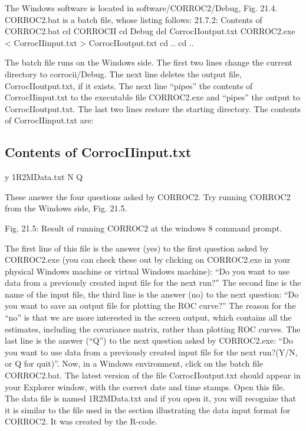 \documentclass[
]{book}
\begin{document}
The Windows software is located in software/CORROC2/Debug, Fig. 21.4. CORROC2.bat is a batch file, whose listing follows:
21.7.2: Contents of CORROC2.bat
cd CORROCII
cd Debug
del CorrocIIoutput.txt
CORROC2.exe \textless{} CorrocIIinput.txt \textgreater{} CorrocIIoutput.txt
cd ..
cd ..

The batch file runs on the Windows side. The first two lines change the current directory to corrocii/Debug. The next line deletes the output file, CorrocIIoutput.txt, if it exists. The next line ``pipes'' the contents of CorrocIIinput.txt to the executable file CORROC2.exe and ``pipes'' the output to CorrocIIoutput.txt. The last two lines restore the starting directory. The contents of CorrocIIinput.txt are:

\hypertarget{bivariate-binormal-model-corroc2-application-corrocii-input}{%
\subsection{Contents of CorrocIIinput.txt}\label{bivariate-binormal-model-corroc2-application-corrocii-input}}

y
1R2MData.txt
N
Q

These answer the four questions asked by CORROC2. Try running CORROC2 from the Windows side, Fig. 21.5.

Fig. 21.5: Result of running CORROC2 at the windows 8 command prompt.

The first line of this file is the answer (yes) to the first question asked by CORROC2.exe (you can check these out by clicking on CORROC2.exe in your physical Windows machine or virtual Windows machine): ``Do you want to use data from a previously created input file for the next run?'' The second line is the name of the input file, the third line is the answer (no) to the next question: ``Do you want to save an output file for plotting the ROC curve?'' The reason for the ``no'' is that we are more interested in the screen output, which contains all the estimates, including the covariance matrix, rather than plotting ROC curves. The last line is the answer (``Q'') to the next question asked by CORROC2.exe: ``Do you want to use data from a previously created input file for the next run?(Y/N, or Q for quit)''. Now, in a Windows environment, click on the batch file CORROC2.bat. The latest version of the file CorrocIIoutput.txt should appear in your Explorer window, with the correct date and time stamps. Open this file. The data file is named 1R2MData.txt and if you open it, you will recognize that it is similar to the file used in the section illustrating the data input format for CORROC2. It was created by the R-code.
\end{document}
